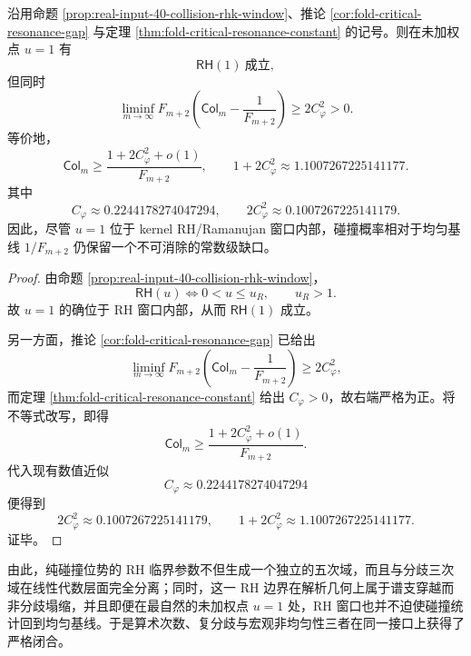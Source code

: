 \begin{theorem}[RH 窗口与常数级均匀性缺口严格共存]\label{thm:xi-time-part9pb-rh-window-uniform-gap-coexistence}
沿用命题 \ref{prop:real-input-40-collision-rhk-window}、推论
\ref{cor:fold-critical-resonance-gap} 与定理 \ref{thm:fold-critical-resonance-constant} 的记号。则在未加权点 \(u=1\) 有
\[
\textsf{RH}(1)\ \text{成立},
\]
但同时
\[
\boxed{\ 
\liminf_{m\to\infty}
F_{m+2}\left(\mathsf{Col}_m-\frac{1}{F_{m+2}}\right)
\ge
2C_\varphi^2
>0.\ }
\]
等价地，
\[
\boxed{\ 
\mathsf{Col}_m
\ge
\frac{1+2C_\varphi^2+o(1)}{F_{m+2}},
\qquad
1+2C_\varphi^2\approx 1.1007267225141177.\ }
\]
其中
\[
C_\varphi\approx 0.2244178274047294,
\qquad
2C_\varphi^2\approx 0.1007267225141179.
\]
因此，尽管 \(u=1\) 位于 kernel RH/Ramanujan 窗口内部，碰撞概率相对于均匀基线 \(1/F_{m+2}\) 仍保留一个不可消除的常数级缺口。
\end{theorem}
\begin{proof}
由命题 \ref{prop:real-input-40-collision-rhk-window}，
\[
\textsf{RH}(u)\Longleftrightarrow 0<u\le u_R,
\qquad
u_R>1.
\]
故 \(u=1\) 的确位于 RH 窗口内部，从而 \(\textsf{RH}(1)\) 成立。

另一方面，推论 \ref{cor:fold-critical-resonance-gap} 已给出
\[
\liminf_{m\to\infty}
F_{m+2}\left(\mathsf{Col}_m-\frac{1}{F_{m+2}}\right)
\ge
2C_\varphi^2,
\]
而定理 \ref{thm:fold-critical-resonance-constant} 给出 \(C_\varphi>0\)，故右端严格为正。将不等式改写，即得
\[
\mathsf{Col}_m
\ge
\frac{1+2C_\varphi^2+o(1)}{F_{m+2}}.
\]
代入现有数值近似
\[
C_\varphi\approx 0.2244178274047294
\]
便得到
\[
2C_\varphi^2\approx 0.1007267225141179,
\qquad
1+2C_\varphi^2\approx 1.1007267225141177.
\]
证毕。
\end{proof}

\noindent
由此，纯碰撞位势的 RH 临界参数不但生成一个独立的五次域，而且与分歧三次域在线性代数层面完全分离；同时，这一 RH 边界在解析几何上属于谱支穿越而非分歧塌缩，并且即便在最自然的未加权点 \(u=1\) 处，RH 窗口也并不迫使碰撞统计回到均匀基线。于是算术次数、复分歧与宏观非均匀性三者在同一接口上获得了严格闭合。

\endinput

